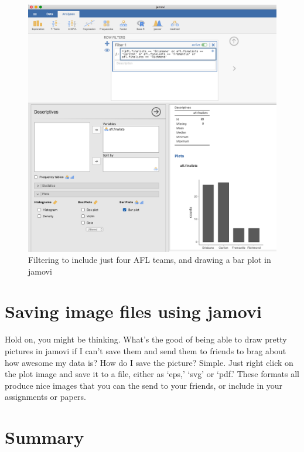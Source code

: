 \documentclass[
]{book}
\begin{document}
\begin{figure}

{\centering \includegraphics[width=1\linewidth]{img/graphics/bar1} 

}

\caption{Filtering to include just four AFL teams, and drawing a bar plot in jamovi}\label{fig:bar1}
\end{figure}

\hypertarget{saveimage}{%
\section{Saving image files using jamovi}\label{saveimage}}

Hold on, you might be thinking. What's the good of being able to draw pretty pictures in jamovi if I can't save them and send them to friends to brag about how awesome my data is? How do I save the picture? Simple. Just right click on the plot image and save it to a file, either as `eps,' `svg' or `pdf.' These formats all produce nice images that you can the send to your friends, or include in your assignments or papers.

\hypertarget{summary-2}{%
\section{Summary}\label{summary-2}}
\end{document}
